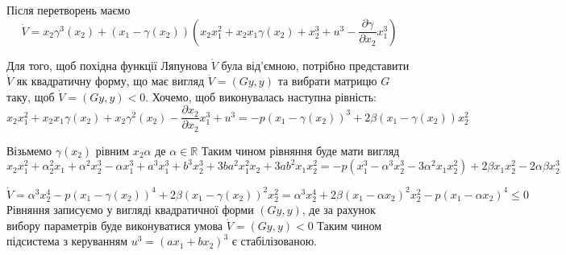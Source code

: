 \documentclass{article}
\begin{document}
Після перетворень маємо
\begin{equation}
    \dot V = x_2\gamma^3(x_2)+(x_1 - \gamma(x_2))
    (x_2x_1^2 + x_2x_1\gamma(x_2) + x_{2}^3 + u^3- 
    \frac{\partial \gamma}{\partial x_2}x_{1}^3)
\end{equation}

Для того, щоб похідна функції Ляпунова $\dot V$ була від'ємною, потрібно
представити  $\dot V$ як квадратичну форму, що має вигляд $\dot V =(Gy,y)$ 
та вибрати матрицю $G$ таку, щоб  $\dot V =(Gy,y) < 0$.
Хочемо, щоб виконувалась наступна рівність:
\begin{equation}
    x_2x_1^2+x_2x_1\gamma(x_2) + x_2 \gamma^2(x_2) - 
    \frac{\partial x_2}{\partial x_2}x_1^3 + u^3 = 
    -p(x_1-\gamma(x_2))^3 +2\beta(x_1-\gamma(x_2))x_{2}^2 
\end{equation}

Візьмемо $\gamma(x_2)$ рівним $x_2\alpha$ де $\alpha \in \mathbb{R}$
Таким чином рівняння буде мати вигляд
\begin{equation}
x_2x_{1}^2 + \alpha_{2}^2x_1 + \alpha^2x_2^3-\alpha x_{1}^3 +
a^3x_{1}^3 + b^3x_{2}^3+ 
3ba^2x_{1}^2x_2+3ab^2x_1x_{2}^2 = 
-p(x_1^3 - \alpha^{3}x_{2}^3 - 3\alpha^{2}x_1x_{2}^2)+
2\beta x_1x_{2}^2 - 2\alpha \beta x_2^3
\end{equation}


\begin{equation}
    \dot V = \alpha^3x_{2}^4 - p(x_1-\gamma(x_2))^4
    +2\beta(x_1-\gamma(x_2))^2x_{2}^2 = 
    \alpha^3x_{2}^4 + 2\beta(x_1-\alpha x_2)^2x_{2}^2
    -p(x_1-\alpha x_2)^4 \leq 0
\end{equation}
Рівняння записуємо у вигляді квадратичної форми
$(Gy,y)$, де за рахунок вибору параметрів буде виконуватися
умова $\dot V =(Gy,y) < 0$ 
Таким чином підсистема з керуванням  $u^3=(ax_1+bx_2)^3$ 
є стабілізованою. 
\end{document}

